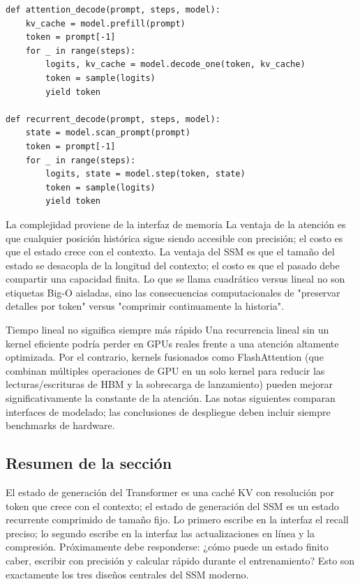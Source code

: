 \documentclass[a4paper]{article}
\begin{document}
\begin{lstlisting}[caption={Comparación de interfaces de decodificación entre caché de atención y estado recurrente}]
def attention_decode(prompt, steps, model):
    kv_cache = model.prefill(prompt)
    token = prompt[-1]
    for _ in range(steps):
        logits, kv_cache = model.decode_one(token, kv_cache)
        token = sample(logits)
        yield token

def recurrent_decode(prompt, steps, model):
    state = model.scan_prompt(prompt)
    token = prompt[-1]
    for _ in range(steps):
        logits, state = model.step(token, state)
        token = sample(logits)
        yield token
\end{lstlisting}

\begin{importantbox}{La complejidad proviene de la interfaz de memoria}
La ventaja de la atención es que cualquier posición histórica sigue siendo accesible con precisión; el costo es que el estado crece con el contexto. La ventaja del SSM es que el tamaño del estado se desacopla de la longitud del contexto; el costo es que el pasado debe compartir una capacidad finita. Lo que se llama cuadrático versus lineal no son etiquetas Big-O aisladas, sino las consecuencias computacionales de "preservar detalles por token" versus "comprimir continuamente la historia".
\end{importantbox}

\begin{warningbox}{Tiempo lineal no significa siempre más rápido}
Una recurrencia lineal sin un kernel eficiente podría perder en GPUs reales frente a una atención altamente optimizada. Por el contrario, kernels fusionados como FlashAttention (que combinan múltiples operaciones de GPU en un solo kernel para reducir las lecturas/escrituras de HBM y la sobrecarga de lanzamiento) pueden mejorar significativamente la constante de la atención. Las notas siguientes comparan interfaces de modelado; las conclusiones de despliegue deben incluir siempre benchmarks de hardware.
\end{warningbox}

\subsection{Resumen de la sección}

El estado de generación del Transformer es una caché KV con resolución por token que crece con el contexto; el estado de generación del SSM es un estado recurrente comprimido de tamaño fijo. Lo primero escribe en la interfaz el recall preciso; lo segundo escribe en la interfaz las actualizaciones en línea y la compresión. Próximamente debe responderse: ¿cómo puede un estado finito caber, escribir con precisión y calcular rápido durante el entrenamiento? Esto son exactamente los tres diseños centrales del SSM moderno.
\end{document}

